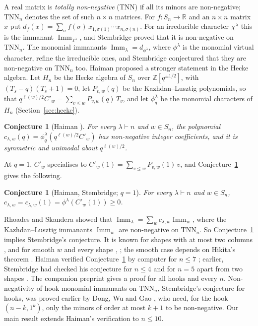 \documentclass[11pt]{amsart}
\newtheorem{conjecture}[theorem]{Conjecture}
\theoremstyle{definition}
\theoremstyle{remark}
\newcommand{\Z}{\mathbb{Z}}
\newcommand{\R}{\mathbb{R}}
\newcommand{\Imm}{\operatorname{Imm}}
\newcommand{\TNN}{\mathrm{TNN}}
\newcommand{\Cp}[1]{C'_{#1}(1)}
\begin{document}
A real matrix is \emph{totally non-negative} (TNN) if all its minors are non-negative; $\TNN_n$ denotes the set of such $n\times n$ matrices. For $f\colon S_n\to\R$ and an $n\times n$ matrix $x$ put $d_f(x)=\sum_{\sigma}f(\sigma)\,x_{1,\sigma(1)}\cdots x_{n,\sigma(n)}$. For an irreducible character $\chi^\lambda$ this is the immanant $\Imm_{\chi^\lambda}$, and Stembridge \cite{Ste91} proved that it is non-negative on $\TNN_n$. The monomial immanants $\Imm_\lambda=d_{\phi^\lambda}$, where $\phi^\lambda$ is the monomial virtual character, refine the irreducible ones, and Stembridge conjectured \cite[Conj.~2.1]{Ste92} that they are non-negative on $\TNN_n$ too. Haiman \cite{Hai} proposed a stronger statement in the Hecke algebra. Let $H_n$ be the Hecke algebra of $S_n$ over $\Z[q^{\pm1/2}]$, with $(T_s-q)(T_s+1)=0$, let $P_{v,w}(q)$ be the Kazhdan--Lusztig polynomials, so that $q^{\ell(w)/2}C'_w=\sum_{v\le w}P_{v,w}(q)\,T_v$, and let $\phi^\lambda_q$ be the monomial characters of $H_n$ (Section~\ref{sec:hecke}).

\begin{conjecture}[Haiman {\cite[Conj.~2.1]{Hai}}]\label{conj:Hq}
For every $\lambda\vdash n$ and $w\in S_n$, the polynomial $c_{\lambda,w}(q)=\phi^\lambda_q(q^{\ell(w)/2}C'_w)$ has non-negative integer coefficients, and it is symmetric and unimodal about $q^{\ell(w)/2}$.
\end{conjecture}

At $q=1$, $C'_w$ specialises to $\Cp w=\sum_{v\le w}P_{v,w}(1)\,v$, and Conjecture~\ref{conj:Hq} gives the following.

\begin{conjecture}[Haiman, Stembridge; $q=1$]\label{conj:H}
For every $\lambda\vdash n$ and $w\in S_n$, $c_{\lambda,w}=c_{\lambda,w}(1)=\phi^\lambda(\Cp w)\ge 0$.
\end{conjecture}

Rhoades and Skandera \cite{RS06} showed that $\Imm_\lambda=\sum_wc_{\lambda,w}\Imm_w$, where the Kazhdan--Lusztig immanants $\Imm_w$ are non-negative on $\TNN_n$. So Conjecture~\ref{conj:H} implies Stembridge's conjecture. It is known for shapes with at most two columns \cite{CSS,RS06}, and for smooth $w$ and every shape \cite{CHSS,AN,Hik}, \cite[Prop.~25]{Ska25}; the smooth case depends on Hikita's theorem \cite{Hik}. Haiman verified Conjecture~\ref{conj:Hq} by computer for $n\le7$ \cite[\S4]{Hai}; earlier, Stembridge had checked his conjecture for $n\le4$ and for $n=5$ apart from two shapes \cite{Ste92}. The companion preprint \cite{McN} gives a proof for all hooks and every $n$. Non-negativity of hook monomial immanants on $\TNN_n$, Stembridge's conjecture for hooks, was proved earlier by Dong, Wu and Gao \cite{DWG}, who need, for the hook $(n-k,1^k)$, only the minors of order at most $k+1$ to be non-negative. Our main result extends Haiman's verification to $n\le10$.
\end{document}
